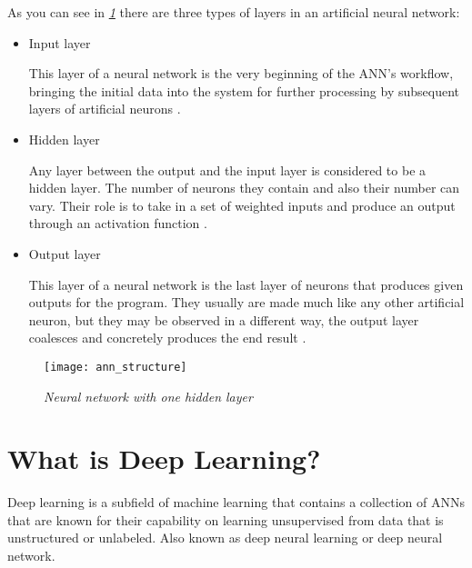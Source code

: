 As you can see in \emph{\ref{fig:ann_structure}} there are three types of layers in an artificial neural network:
\begin{itemize}[]
    \item{ Input layer
          \begin{adjustwidth}{1cm}{}
              This layer of a neural network is the very beginning of the ANN’s workflow, bringing the initial data into the system for
              further processing by subsequent layers of artificial neurons \cite{inputLayer}.
          \end{adjustwidth}
          }
    \item{ Hidden layer
          \begin{adjustwidth}{1cm}{}
              Any layer between the output and the input layer is considered to be a hidden layer.
              The number of neurons they contain and also their number can vary.
              Their role is to take in a set of weighted inputs and produce an output through an activation function \cite{hiddenlayer}.
          \end{adjustwidth}
          }
    \item{ Output layer
          \begin{adjustwidth}{1cm}{}
              This layer of a neural network is the last layer of neurons that produces given outputs for the program.
              They usually are made much like any other artificial neuron, but they may be observed in a different way,
              the output layer coalesces and concretely produces the end result \cite{outputLayer}.
          \end{adjustwidth}
          }
\end{itemize}
\begin{figure}[h]
    \centering
    \texttt{[image: ann\_structure]}
    \caption{\emph{Neural network with one hidden layer \cite{understandingANN}}}
    \label{fig:ann_structure}
\end{figure}


\section{What is Deep Learning?}

Deep learning is a subfield of machine learning that contains a collection of ANNs that are known for
their capability on learning unsupervised from data that is unstructured or unlabeled.
Also known as deep neural learning or deep neural network.
\vspace{0.5cm}

